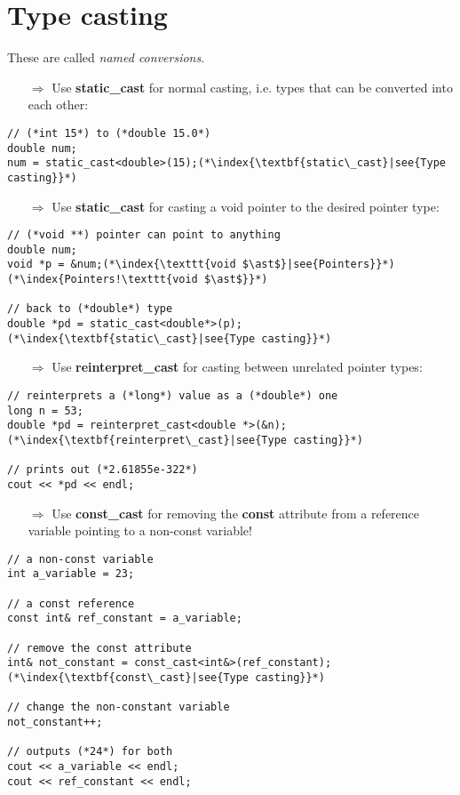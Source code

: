 \documentclass[10pt]{article}
\begin{document}
\section{Type casting}
\small
These are called \emph{named conversions}.
\begin{enumerate}
\item[$\Rightarrow$] Use \textbf{static\_cast} for normal casting, i.e. types that can be converted into each other:
\end{enumerate}
\begin{lstlisting}
// (*int 15*) to (*double 15.0*)
double num;
num = static_cast<double>(15);(*\index{\textbf{static\_cast}|see{Type casting}}*)
\end{lstlisting}
\begin{enumerate}
\item[$\Rightarrow$] Use \textbf{static\_cast} for casting a void pointer to the desired pointer type:
\end{enumerate}
\begin{lstlisting}
// (*void **) pointer can point to anything
double num;
void *p = &num;(*\index{\texttt{void $\ast$}|see{Pointers}}*)(*\index{Pointers!\texttt{void $\ast$}}*) 

// back to (*double*) type
double *pd = static_cast<double*>(p);(*\index{\textbf{static\_cast}|see{Type casting}}*)
\end{lstlisting}
\begin{enumerate}
\item[$\Rightarrow$] Use \textbf{reinterpret\_cast} for casting between unrelated pointer types:
\end{enumerate}
\begin{lstlisting}
// reinterprets a (*long*) value as a (*double*) one
long n = 53;
double *pd = reinterpret_cast<double *>(&n);(*\index{\textbf{reinterpret\_cast}|see{Type casting}}*)

// prints out (*2.61855e-322*)
cout << *pd << endl;
\end{lstlisting}
\begin{enumerate}
\item[$\Rightarrow$] Use \textbf{const\_cast} for removing the \textbf{const} attribute from a reference variable pointing to a non-const variable!
\end{enumerate}
\begin{lstlisting}
// a non-const variable
int a_variable = 23;

// a const reference
const int& ref_constant = a_variable;

// remove the const attribute
int& not_constant = const_cast<int&>(ref_constant);(*\index{\textbf{const\_cast}|see{Type casting}}*)

// change the non-constant variable
not_constant++;

// outputs (*24*) for both
cout << a_variable << endl;
cout << ref_constant << endl;
\end{lstlisting}
\end{document}
